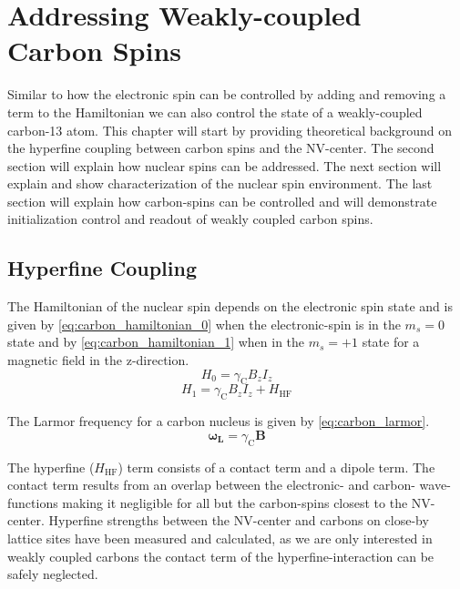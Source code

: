 
\chapter{Addressing Weakly-coupled Carbon Spins}
Similar to how the electronic spin can be controlled by adding and removing a term to the Hamiltonian we can also control the state of a weakly-coupled carbon-13 atom.
This chapter will start by providing theoretical background on the hyperfine coupling between carbon spins and the NV-center.
The second section will explain how nuclear spins can be addressed.
The next section will explain and show characterization of the nuclear spin environment.
The last section will explain how carbon-spins can be controlled and will demonstrate initialization control and readout of weakly coupled carbon spins.
\section{Hyperfine Coupling}

The Hamiltonian of the nuclear spin depends on the electronic spin state and is given by \cref{eq:carbon_hamiltonian_0} when the electronic-spin is in the $m_s = 0$ state and by \cref{eq:carbon_hamiltonian_1} when in the $m_s = +1$ state for a magnetic field in the z-direction\citep{Taminiau2014Universal}.
 \begin{equation}
 \label{eq:carbon_hamiltonian_0}
H_0= \gamma_{\mathrm{C}} B_z I_z
\end{equation}
\begin{equation}
 \label{eq:carbon_hamiltonian_1}
    H_1 = \gamma_{\mathrm{C}} B_z I_z +H_{\mathrm{HF}}
\end{equation}

The Larmor frequency for a carbon nucleus is given by  \cref{eq:carbon_larmor}.
\begin{equation}
\label{eq:carbon_larmor}
\bm{\omega_L} = \gamma_{\mathrm{C}}\bm{B}
\end{equation}

The hyperfine ($H_{\mathrm{HF}}$) term consists of a contact term and a dipole term.
The contact term results from an overlap between the electronic- and carbon- wave-functions making it negligible for all but the carbon-spins closest to the NV-center.
Hyperfine strengths between the NV-center and carbons on close-by lattice sites have been measured\citep{Smeltzer201113} and calculated\citep{Gali2008Ab,Gali2009Identification}, as we are only interested in weakly coupled carbons the contact term of the hyperfine-interaction can be safely neglected.

